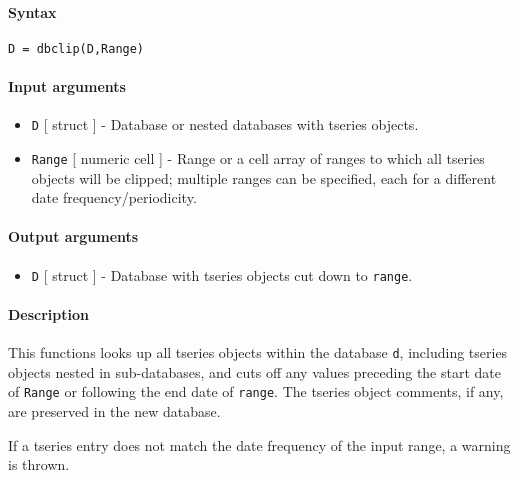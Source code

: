


	\paragraph{Syntax}

\begin{verbatim}
D = dbclip(D,Range)
\end{verbatim}

\paragraph{Input arguments}

\begin{itemize}
\item
  \texttt{D} {[} struct {]} - Database or nested databases with tseries
  objects.
\item
  \texttt{Range} {[} numeric \textbar{} cell {]} - Range or a cell array
  of ranges to which all tseries objects will be clipped; multiple
  ranges can be specified, each for a different date
  frequency/periodicity.
\end{itemize}

\paragraph{Output arguments}

\begin{itemize}
\itemsep1pt\parskip0pt
\item
  \texttt{D} {[} struct {]} - Database with tseries objects cut down to
  \texttt{range}.
\end{itemize}

\paragraph{Description}

This functions looks up all tseries objects within the database
\texttt{d}, including tseries objects nested in sub-databases, and cuts
off any values preceding the start date of \texttt{Range} or following
the end date of \texttt{range}. The tseries object comments, if any, are
preserved in the new database.

If a tseries entry does not match the date frequency of the input range,
a warning is thrown.

